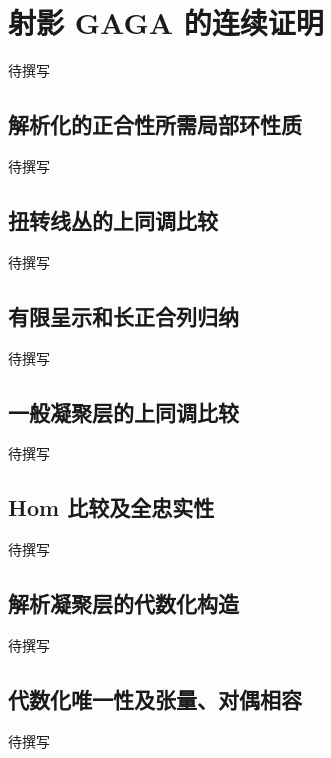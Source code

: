 
% 
% 

\section{射影 GAGA 的连续证明}
\label{g4:sec:2004}

待撰写

\subsection{解析化的正合性所需局部环性质}
\label{g4:subsec:2004:01}
待撰写

\subsection{扭转线丛的上同调比较}
\label{g4:subsec:2004:02}
待撰写

\subsection{有限呈示和长正合列归纳}
\label{g4:subsec:2004:03}
待撰写

\subsection{一般凝聚层的上同调比较}
\label{g4:subsec:2004:04}
待撰写

\subsection{Hom 比较及全忠实性}
\label{g4:subsec:2004:05}
待撰写

\subsection{解析凝聚层的代数化构造}
\label{g4:subsec:2004:06}
待撰写

\subsection{代数化唯一性及张量、对偶相容}
\label{g4:subsec:2004:07}
待撰写
